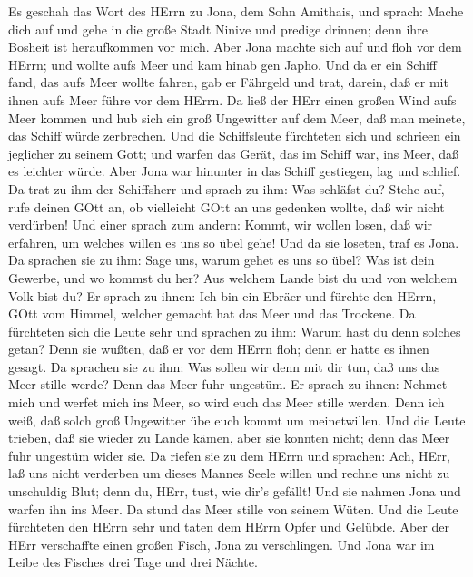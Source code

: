  Es geschah das Wort des HErrn zu Jona, dem Sohn Amithais,
und sprach:  Mache dich auf und gehe in die große Stadt
Ninive und predige drinnen; denn ihre Bosheit ist heraufkommen vor mich.
 Aber Jona machte sich auf und floh vor dem HErrn; und
wollte aufs Meer und kam hinab gen Japho. Und da er ein Schiff fand, das
aufs Meer wollte fahren, gab er Fährgeld und trat, darein, daß er mit
ihnen aufs Meer führe vor dem HErrn.  Da ließ der HErr einen
großen Wind aufs Meer kommen und hub sich ein groß Ungewitter auf dem
Meer, daß man meinete, das Schiff würde zerbrechen.  Und die
Schiffsleute fürchteten sich und schrieen ein jeglicher zu seinem Gott;
und warfen das Gerät, das im Schiff war, ins Meer, daß es leichter
würde. Aber Jona war hinunter in das Schiff gestiegen, lag und schlief.
 Da trat zu ihm der Schiffsherr und sprach zu ihm: Was
schläfst du? Stehe auf, rufe deinen GOtt an, ob vielleicht GOtt an uns
gedenken wollte, daß wir nicht verdürben!  Und einer sprach
zum andern: Kommt, wir wollen losen, daß wir erfahren, um welches willen
es uns so übel gehe! Und da sie loseten, traf es Jona.  Da
sprachen sie zu ihm: Sage uns, warum gehet es uns so übel? Was ist dein
Gewerbe, und wo kommst du her? Aus welchem Lande bist du und von welchem
Volk bist du?  Er sprach zu ihnen: Ich bin ein Ebräer und
fürchte den HErrn, GOtt vom Himmel, welcher gemacht hat das Meer und das
Trockene.  Da fürchteten sich die Leute sehr und sprachen
zu ihm: Warum hast du denn solches getan? Denn sie wußten, daß er vor
dem HErrn floh; denn er hatte es ihnen gesagt.  Da sprachen
sie zu ihm: Was sollen wir denn mit dir tun, daß uns das Meer stille
werde? Denn das Meer fuhr ungestüm.  Er sprach zu ihnen:
Nehmet mich und werfet mich ins Meer, so wird euch das Meer stille
werden. Denn ich weiß, daß solch groß Ungewitter übe euch kommt um
meinetwillen.  Und die Leute trieben, daß sie wieder zu
Lande kämen, aber sie konnten nicht; denn das Meer fuhr ungestüm wider
sie.  Da riefen sie zu dem HErrn und sprachen: Ach, HErr,
laß uns nicht verderben um dieses Mannes Seele willen und rechne uns
nicht zu unschuldig Blut; denn du, HErr, tust, wie dir's gefällt!
 Und sie nahmen Jona und warfen ihn ins Meer. Da stund das
Meer stille von seinem Wüten.  Und die Leute fürchteten den
HErrn sehr und taten dem HErrn Opfer und Gelübde.  Aber der
HErr verschaffte einen großen Fisch, Jona zu verschlingen. Und Jona war
im Leibe des Fisches drei Tage und drei Nächte.

